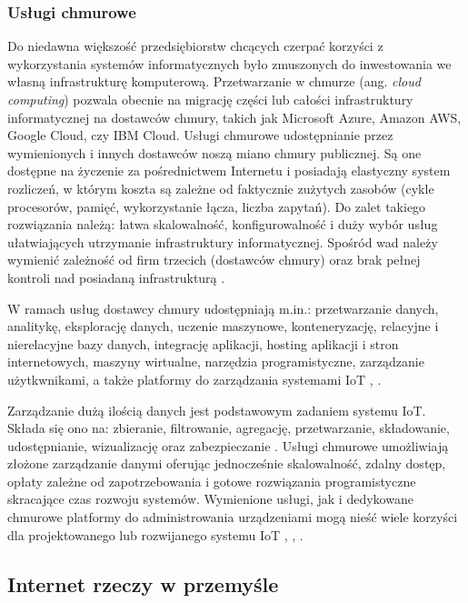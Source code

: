 \documentclass[a4paper, 12pt, twoside]{article}
\begin{document}
\subsubsection{Usługi chmurowe}

Do niedawna większość przedsiębiorstw chcących czerpać korzyści z wykorzystania
systemów informatycznych było zmuszonych do inwestowania we własną infrastrukturę
komputerową. Przetwarzanie w chmurze (ang. \emph{cloud computing}) pozwala obecnie 
na migrację części lub całości infrastruktury informatycznej na dostawców chmury,
takich jak Microsoft Azure, Amazon AWS, Google Cloud, czy IBM Cloud. Usługi chmurowe
udostępnianie przez wymienionych i innych dostawców noszą miano chmury publicznej. 
Są one dostępne na życzenie za pośrednictwem Internetu i posiadają elastyczny
system rozliczeń, w którym koszta są zależne od faktycznie zużytych zasobów
(cykle procesorów, pamięć, wykorzystanie łącza, liczba zapytań). Do zalet takiego
rozwiązania należą: łatwa skalowalność, konfigurowalność i duży wybór usług
ułatwiających utrzymanie infrastruktury informatycznej. Spośród wad należy wymienić
zależność od firm trzecich (dostawców chmury) oraz brak pełnej kontroli nad 
posiadaną infrastrukturą \cite{iot-hype-to-reality}.

W ramach usług dostawcy chmury udostępniają m.in.: przetwarzanie danych, 
analitykę, eksplorację danych, uczenie maszynowe, konteneryzację, relacyjne i nierelacyjne
bazy danych, integrację aplikacji, hosting aplikacji i stron internetowych, 
maszyny wirtualne, narzędzia programistyczne, zarządzanie użytkwnikami, a także
platformy do zarządzania systemami IoT \cite{aws}, \cite{azure}.

Zarządzanie dużą ilością danych jest podstawowym zadaniem systemu IoT. Składa się ono
na: zbieranie, filtrowanie, agregację, przetwarzanie, składowanie, udostępnianie,
wizualizację oraz zabezpieczanie \cite{intro-to-iot}. Usługi chmurowe umożliwiają złożone zarządzanie
danymi oferując jednocześnie skalowalność, zdalny dostęp, opłaty zależne od zapotrzebowania
i gotowe rozwiązania programistyczne skracające czas rozwoju systemów. 
Wymienione usługi, jak i dedykowane chmurowe platformy do administrowania 
urządzeniami mogą nieść wiele korzyści dla projektowanego lub rozwijanego
systemu IoT \cite{measuring-value-of-cloud-computing}, \cite{iot-and-cloud}, \cite{iot-in-industrial-sector}. 

\subsection{Internet rzeczy w przemyśle}\label{iiot}
\end{document}
